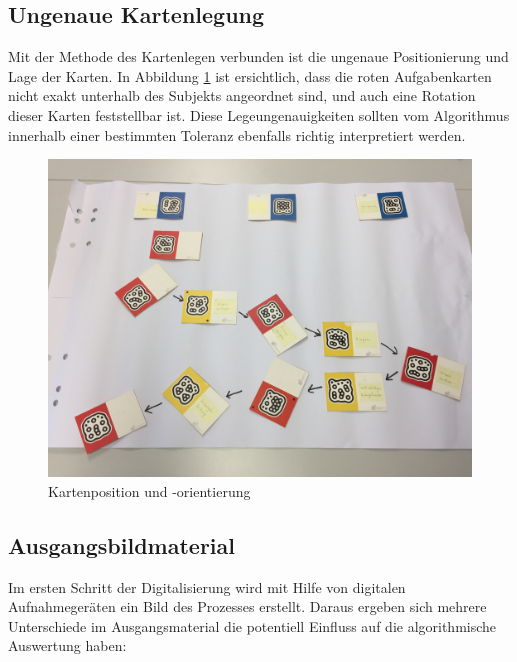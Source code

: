 \subsection{Ungenaue Kartenlegung} %
\label{ssub:ungenaue_kartenlegung}
Mit der Methode des Kartenlegen verbunden ist die ungenaue Positionierung und Lage der Karten. In Abbildung \ref{fig:karten-position} ist ersichtlich, dass die roten Aufgabenkarten nicht exakt unterhalb des Subjekts angeordnet sind, und auch eine Rotation dieser Karten feststellbar ist. Diese Legeungenauigkeiten sollten vom Algorithmus innerhalb einer bestimmten Toleranz ebenfalls richtig interpretiert werden.

\begin{figure}[h]
	\centering 
	\begin{minipage}[b]{0.8\textwidth} 
		\includegraphics[width=\textwidth]{figures/02.jpg}
		\caption{Kartenposition und -orientierung  \protect~\cite{max}} 
		\label{fig:karten-position} 
	\end{minipage}
\end{figure}

\subsection{Ausgangsbildmaterial} %
\label{sub:ausgangsbildmaterial}
Im ersten Schritt der Digitalisierung wird mit Hilfe von digitalen Aufnahmegeräten ein Bild des Prozesses erstellt. Daraus ergeben sich mehrere Unterschiede im Ausgangsmaterial die potentiell Einfluss auf die algorithmische Auswertung haben:

